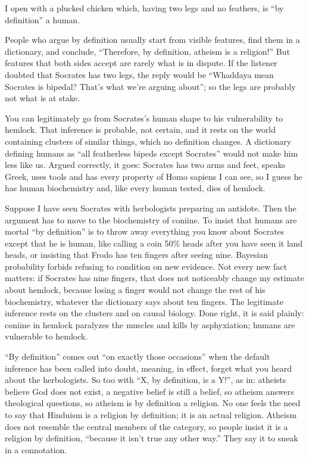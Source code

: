 
I open with a plucked chicken which, having two legs and no feathers, is ``by definition'' a human. 

People who argue by definition usually start from visible features, find them in a dictionary, and conclude, ``Therefore, by definition, atheism is a religion!'' But features that both sides accept are rarely what is in dispute. If the listener doubted that Socrates has two legs, the reply would be ``Whaddaya mean Socrates is bipedal? That's what we're arguing about''; so the legs are probably not what is at stake.

You can legitimately go from Socrates's human shape to his vulnerability to hemlock. That inference is probable, not certain, and it rests on the world containing clusters of similar things, which no definition changes. A dictionary defining humans as ``all featherless bipeds except Socrates'' would not make him less like us. Argued correctly, it goes: Socrates has two arms and feet, speaks Greek, uses tools and has every property of Homo sapiens I can see, so I guess he has human biochemistry and, like every human tested, dies of hemlock.

Suppose I have seen Socrates with herbologists preparing an antidote. Then the argument has to move to the biochemistry of coniine. To insist that humans are mortal ``by definition'' is to throw away everything you know about Socrates except that he is human, like calling a coin 50\% heads after you have seen it land heads, or insisting that Frodo has ten fingers after seeing nine. Bayesian probability forbids refusing to condition on new evidence. Not every new fact matters: if Socrates has nine fingers, that does not noticeably change my estimate about hemlock, because losing a finger would not change the rest of his biochemistry, whatever the dictionary says about ten fingers. The legitimate inference rests on the clusters and on causal biology. Done right, it is said plainly: coniine in hemlock paralyzes the muscles and kills by asphyxiation; humans are vulnerable to hemlock.

``By definition'' comes out ``on exactly those occasions'' when the default inference has been called into doubt, meaning, in effect, forget what you heard about the herbologists. So too with ``X, by definition, is a Y!'', as in: atheists believe God does not exist, a negative belief is still a belief, so atheism answers theological questions, so atheism is by definition a religion. No one feels the need to say that Hinduism is a religion by definition; it is an actual religion. Atheism does not resemble the central members of the category, so people insist it is a religion by definition, ``because it isn't true any other way.'' They say it to sneak in a connotation. 

